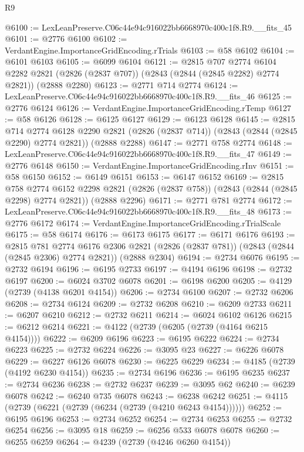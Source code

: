 \begin{lexlean}{R9}
\begin{coremodule}
@6100 := LexLeanPreserve.C06c44e94c916022bb6668970c400c1f8.R9.__fits_45
@6101 := @2776 @6100
@6102 := VerdantEngine.ImportanceGridEncoding.rTrials
@6103 := @58 @6102
@6104 := @6101 @6103
@6105 := @6099 @6104
@6121 := @2815
    @707
    @2774
    @6104
    @2282
    @2821
    (@2826 (@2837 @707))
    (@2843 (@2844 (@2845 @2282) @2774 @2821))
    (@2888 @2280)
@6123 := @2771 @714 @2774
@6124 := LexLeanPreserve.C06c44e94c916022bb6668970c400c1f8.R9.__fits_46
@6125 := @2776 @6124
@6126 := VerdantEngine.ImportanceGridEncoding.rTemp
@6127 := @58 @6126
@6128 := @6125 @6127
@6129 := @6123 @6128
@6145 := @2815
    @714
    @2774
    @6128
    @2290
    @2821
    (@2826 (@2837 @714))
    (@2843 (@2844 (@2845 @2290) @2774 @2821))
    (@2888 @2288)
@6147 := @2771 @758 @2774
@6148 := LexLeanPreserve.C06c44e94c916022bb6668970c400c1f8.R9.__fits_47
@6149 := @2776 @6148
@6150 := VerdantEngine.ImportanceGridEncoding.rInv
@6151 := @58 @6150
@6152 := @6149 @6151
@6153 := @6147 @6152
@6169 := @2815
    @758
    @2774
    @6152
    @2298
    @2821
    (@2826 (@2837 @758))
    (@2843 (@2844 (@2845 @2298) @2774 @2821))
    (@2888 @2296)
@6171 := @2771 @781 @2774
@6172 := LexLeanPreserve.C06c44e94c916022bb6668970c400c1f8.R9.__fits_48
@6173 := @2776 @6172
@6174 := VerdantEngine.ImportanceGridEncoding.rTrialScale
@6175 := @58 @6174
@6176 := @6173 @6175
@6177 := @6171 @6176
@6193 := @2815
    @781
    @2774
    @6176
    @2306
    @2821
    (@2826 (@2837 @781))
    (@2843 (@2844 (@2845 @2306) @2774 @2821))
    (@2888 @2304)
@6194 := @2734 @6076
@6195 := @2732 @6194
@6196 := @6195 @2733
@6197 := @4194 @6196
@6198 := @2732 @6197
@6200 := @6024 @3702 @6078
@6201 := @6198 @6200
@6205 := @4129 (@2739 (@4138 @6201 @4154))
@6206 := @2734 @6100
@6207 := @2732 @6206
@6208 := @2734 @6124
@6209 := @2732 @6208
@6210 := @6209 @2733
@6211 := @6207 @6210
@6212 := @2732 @6211
@6214 := @6024 @6102 @6126
@6215 := @6212 @6214
@6221 := @4122 (@2739 (@6205 (@2739 (@4164 @6215 @4154))))
@6222 := @6209 @6196
@6223 := @6195 @6222
@6224 := @2734 @6223
@6225 := @2732 @6224
@6226 := @3095 @23
@6227 := @6226 @6078
@6229 := @6227 @6126 @6078
@6230 := @6225 @6229
@6234 := @4185 (@2739 (@4192 @6230 @4154))
@6235 := @2734 @6196
@6236 := @6195 @6235
@6237 := @2734 @6236
@6238 := @2732 @6237
@6239 := @3095 @62
@6240 := @6239 @6078
@6242 := @6240 @735 @6078
@6243 := @6238 @6242
@6251 := @4115 (@2739 (@6221 (@2739 (@6234 (@2739 (@4210 @6243 @4154))))))
@6252 := @6195 @6196
@6253 := @2734 @6252
@6254 := @2734 @6253
@6255 := @2732 @6254
@6256 := @3095 @18
@6259 := @6256 @533 @6078 @6078
@6260 := @6255 @6259
@6264 := @4239 (@2739 (@4246 @6260 @4154))

\end{coremodule}
\end{lexlean}
